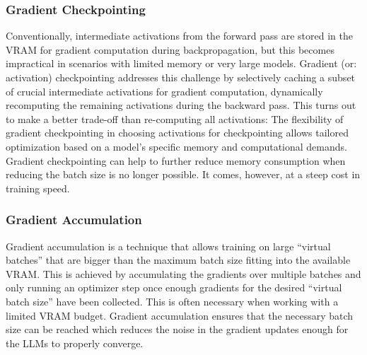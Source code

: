 \documentclass[conference]{IEEEtran}
\begin{document}
\subsubsection{Gradient Checkpointing}
Conventionally, intermediate activations from the forward pass are stored in the VRAM for gradient computation during backpropagation, but this becomes impractical in scenarios with limited memory or very large models. Gradient (or: activation) checkpointing \cite{chen_training_2016, gruslys_memory-efficient_2016} addresses this challenge by selectively caching a subset of crucial intermediate activations for gradient computation, dynamically recomputing the remaining activations during the backward pass. This turns out to make a better trade-off than re-computing all activations: The flexibility of gradient checkpointing in choosing activations for checkpointing allows tailored optimization based on a model's specific memory and computational demands.
Gradient checkpointing can help to further reduce memory consumption when reducing the batch size is no longer possible. It comes, however, at a steep cost in training speed.


\subsubsection{Gradient Accumulation}
Gradient accumulation \cite{gugger2022accelerate} is a technique that allows training on large ``virtual batches'' that are bigger than the maximum batch size fitting into the available VRAM. This is achieved by accumulating the gradients over multiple batches and only running an optimizer step once enough gradients for the desired ``virtual batch size'' have been collected. 
This is often necessary when working with a limited VRAM budget. Gradient accumulation ensures that the necessary batch size can be reached which reduces the noise in the gradient updates enough for the LLMs to properly converge.
\end{document}
